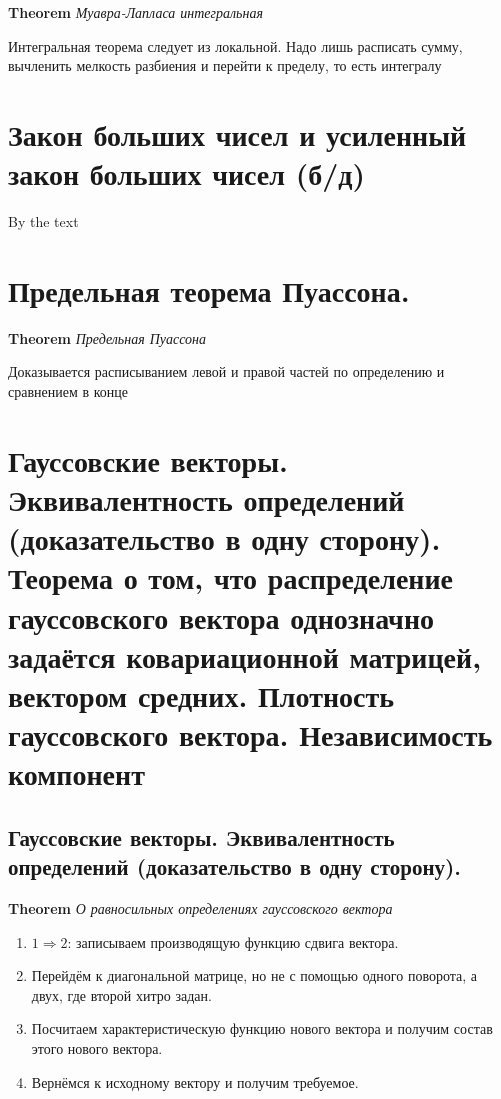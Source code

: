 \documentclass[a4paper, 14pt]{article}
\begin{document}
    \textbf{Theorem} \textit{Муавра-Лапласа интегральная}
    
    Интегральная теорема следует из локальной.
    Надо лишь расписать сумму, вычленить мелкость разбиения и перейти к пределу, то есть интегралу
    
    \section{Закон больших чисел и усиленный закон больших чисел (б/д)}
    
    By the text
    
    \section{Предельная теорема Пуассона.}
    
    \textbf{Theorem} \textit{Предельная Пуассона}
    
    Доказывается расписыванием левой и правой частей по определению и сравнением в конце
    
    \section{Гауссовские векторы. Эквивалентность определений (доказательство в одну сторону).
    Теорема о том, что распределение гауссовского вектора однозначно задаётся ковариационной матрицей, вектором средних.
    Плотность гауссовского вектора.
    Независимость компонент}
    
    \subsection{Гауссовские векторы. Эквивалентность определений (доказательство в одну сторону).}
    
    \textbf{Theorem} \textit{О равносильных определениях гауссовского вектора}
    
    \begin{enumerate}
        \item $1 \Rightarrow 2$: записываем производящую функцию сдвига вектора.
        \item Перейдём к диагональной матрице, но не с помощью одного поворота, а двух, где второй хитро задан.
        \item Посчитаем характеристическую функцию нового вектора и получим состав этого нового вектора.
        \item Вернёмся к исходному вектору и получим требуемое.
    \end{enumerate}
    
\end{document}
